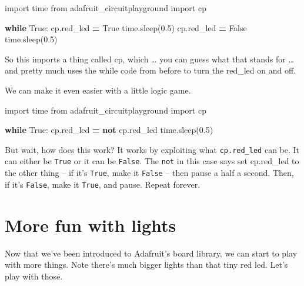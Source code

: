 \documentclass[
]{book}
\newenvironment{Shaded}{\begin{snugshade}}{\end{snugshade}}
\newcommand{\ControlFlowTok}[1]{\textcolor[rgb]{0.13,0.29,0.53}{\textbf{#1}}}
\newcommand{\FloatTok}[1]{\textcolor[rgb]{0.00,0.00,0.81}{#1}}
\newcommand{\ImportTok}[1]{#1}
\newcommand{\KeywordTok}[1]{\textcolor[rgb]{0.13,0.29,0.53}{\textbf{#1}}}
\newcommand{\NormalTok}[1]{#1}
\newcommand{\OperatorTok}[1]{\textcolor[rgb]{0.81,0.36,0.00}{\textbf{#1}}}
\newcommand{\VariableTok}[1]{\textcolor[rgb]{0.00,0.00,0.00}{#1}}
\begin{document}
\begin{Shaded}
\begin{Highlighting}[]
\ImportTok{import}\NormalTok{ time}
\ImportTok{from}\NormalTok{ adafruit_circuitplayground }\ImportTok{import}\NormalTok{ cp}
 
\ControlFlowTok{while} \VariableTok{True}\NormalTok{:}
\NormalTok{    cp.red_led }\OperatorTok{=} \VariableTok{True}
\NormalTok{    time.sleep(}\FloatTok{0.5}\NormalTok{)}
\NormalTok{    cp.red_led }\OperatorTok{=} \VariableTok{False}
\NormalTok{    time.sleep(}\FloatTok{0.5}\NormalTok{)}
\end{Highlighting}
\end{Shaded}

So this imports a thing called cp, which \ldots{} you can guess what that stands for \ldots{} and pretty much uses the while code from before to turn the red\_led on and off.

We can make it even easier with a little logic game.

\begin{Shaded}
\begin{Highlighting}[]
\ImportTok{import}\NormalTok{ time}
\ImportTok{from}\NormalTok{ adafruit_circuitplayground }\ImportTok{import}\NormalTok{ cp}

\ControlFlowTok{while} \VariableTok{True}\NormalTok{:}
\NormalTok{    cp.red_led }\OperatorTok{=} \KeywordTok{not}\NormalTok{ cp.red_led}
\NormalTok{    time.sleep(}\FloatTok{0.5}\NormalTok{)}
\end{Highlighting}
\end{Shaded}

But wait, how does this work? It works by exploiting what \texttt{cp.red\_led} can be. It can either be \texttt{True} or it can be \texttt{False}. The \texttt{not} in this case says set cp.red\_led to the other thing -- if it's \texttt{True}, make it \texttt{False} -- then pause a half a second. Then, if it's \texttt{False}, make it \texttt{True}, and pause. Repeat forever.

\hypertarget{more-fun-with-lights}{%
\section{More fun with lights}\label{more-fun-with-lights}}

Now that we've been introduced to Adafruit's board library, we can start to play with more things. Note there's much bigger lights than that tiny red led. Let's play with those.
\end{document}
